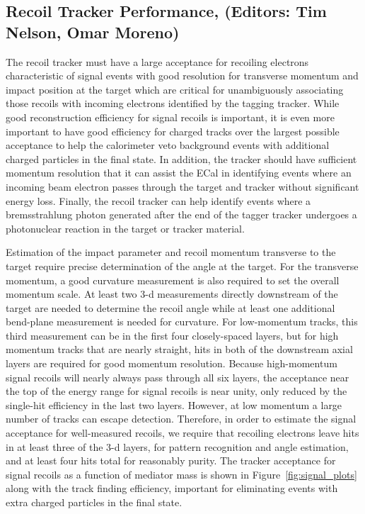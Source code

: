 \subsection{Recoil Tracker Performance, (Editors: Tim Nelson, Omar Moreno)}

The recoil tracker must have a large acceptance for recoiling electrons characteristic of signal events with good resolution for transverse momentum and impact position at the target which are critical for unambiguously associating those recoils with incoming electrons identified by the tagging tracker.  While good reconstruction efficiency for signal recoils is important, it is even more important to have good efficiency for charged tracks over the largest possible acceptance to help the calorimeter veto background events with additional charged particles in the final state.  In addition, the tracker should have sufficient momentum resolution that it can assist the ECal in identifying events where an incoming beam electron passes through the target and tracker without significant energy loss. Finally, the recoil tracker can help identify events where a bremsstrahlung photon generated after the end of the tagger tracker undergoes a photonuclear reaction in the target or tracker material.

Estimation of the impact parameter and recoil momentum transverse to the target require precise determination of the angle at the target.  For the transverse momentum, a good curvature measurement is also required to set the overall momentum scale.  At least two 3-d measurements directly downstream of the target are needed to determine the recoil angle while at least one additional bend-plane measurement is needed for curvature.  For low-momentum tracks, this third measurement can be in the first four closely-spaced layers, but for high momentum tracks that are nearly straight, hits in both of the downstream axial layers are required for good momentum resolution.  Because high-momentum signal recoils will nearly always pass through all six layers, the acceptance near the top of the energy range for signal recoils is near unity, only reduced by the single-hit efficiency in the last two layers. However, at low momentum a large number of tracks can escape detection. Therefore, in order to estimate the signal acceptance for well-measured recoils, we require that recoiling electrons leave hits in at least three of the 3-d layers, for pattern recognition and angle estimation, and at least four hits total for reasonably purity.  The tracker acceptance for signal recoils as a function of mediator mass is shown in Figure~\ref{fig:signal_plots} along with the track finding efficiency, important for eliminating events with extra charged particles in the final state.

